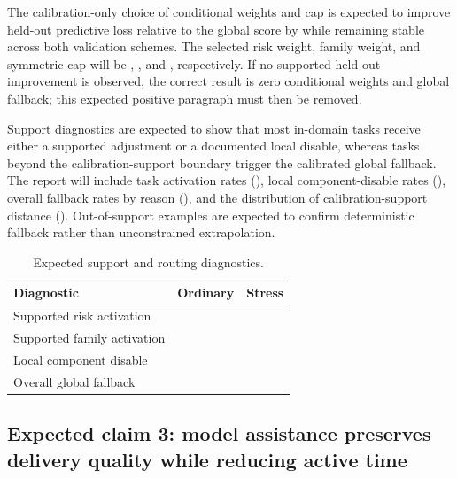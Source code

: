 \expectedresult{} The calibration-only choice of conditional weights and cap is expected to improve held-out predictive loss relative to the global score by \tbddata{} while remaining stable across both validation schemes. The selected risk weight, family weight, and symmetric cap will be \tbddata{}, \tbddata{}, and \tbddata{}, respectively. If no supported held-out improvement is observed, the correct result is zero conditional weights and global fallback; this expected positive paragraph must then be removed.

\expectedresult{} Support diagnostics are expected to show that most in-domain tasks receive either a supported adjustment or a documented local disable, whereas tasks beyond the calibration-support boundary trigger the calibrated global fallback. The report will include task activation rates (\tbddata{}), local component-disable rates (\tbddata{}), overall fallback rates by reason (\tbddata{}), and the distribution of calibration-support distance (\tbddata{}). Out-of-support examples are expected to confirm deterministic fallback rather than unconstrained extrapolation.

\begin{table}[t]
\centering
\caption{Expected support and routing diagnostics. \expectedresult{}}
\label{tab:expectedsupport}
\begin{tabular}{lcc}
\toprule
Diagnostic & Ordinary & Stress \\
\midrule
Supported risk activation & \tbddata{} & \tbddata{} \\
Supported family activation & \tbddata{} & \tbddata{} \\
Local component disable & \tbddata{} & \tbddata{} \\
Overall global fallback & \tbddata{} & \tbddata{} \\
\bottomrule
\end{tabular}
\end{table}

\subsection{Expected claim 3: model assistance preserves delivery quality while reducing active time \expectedresult{}}


